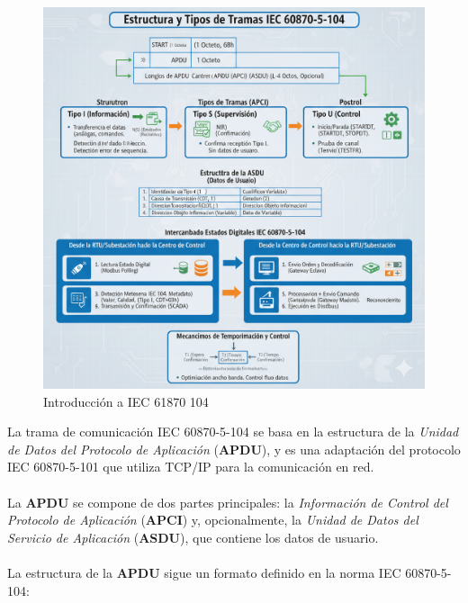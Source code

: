 \documentclass[a5paper]{book}%
\begin{document}
\begin{figure}[H]
  \caption{Introducción a IEC 61870 104}
  \label{fig:capa7iccp}
  \includegraphics[width=\linewidth]{resumen_iec_61870_104}
\end{figure}

La trama de comunicación IEC 60870-5-104 se basa en la estructura de la \textit{Unidad de Datos del Protocolo de Aplicación} (\textbf{APDU}), y es una adaptación del protocolo IEC 60870-5-101 que utiliza TCP/IP para la comunicación en red.\\\\

La \textbf{APDU} se compone de dos partes principales: la \textit{Información de Control del Protocolo de Aplicación }(\textbf{APCI}) y, opcionalmente, la \textit{Unidad de Datos del Servicio de Aplicación} (\textbf{ASDU}), que contiene los datos de usuario.\\\\

La estructura de la \textbf{APDU} sigue un formato definido en la norma IEC 60870-5-104:\\\\
\end{document}
